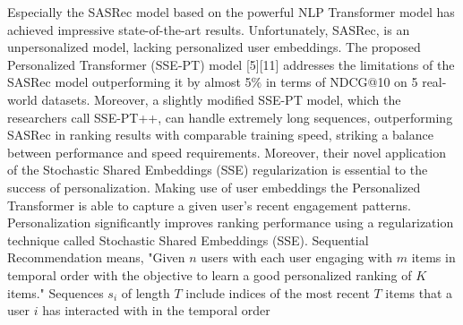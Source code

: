 Especially the SASRec model based on the powerful NLP Transformer model has achieved impressive state-of-the-art results. Unfortunately, SASRec, is an unpersonalized model, lacking personalized user embeddings. The proposed Personalized Transformer (SSE-PT) model [5][11] addresses the limitations of the SASRec model outperforming it by almost 5$\%$ in terms of NDCG@10 on 5 real-world datasets. Moreover, a slightly modified SSE-PT model, which the researchers call SSE-PT++, can handle extremely long sequences, outperforming SASRec in ranking results with comparable training speed, striking a balance between performance and speed requirements. Moreover, their novel application of the Stochastic Shared Embeddings (SSE) regularization is essential to the success of personalization. Making use of user embeddings the Personalized Transformer is able to capture a given user's recent engagement patterns. Personalization significantly improves ranking performance using a regularization technique called Stochastic Shared Embeddings (SSE).
Sequential Recommendation means, "Given $n$ users with each user engaging with $m$ items in temporal order with the objective to learn a good personalized ranking of $K$ items." Sequences $s_i$ of length $T$ include indices of the most recent $T$ items that a user $i$ has interacted with in the temporal order

